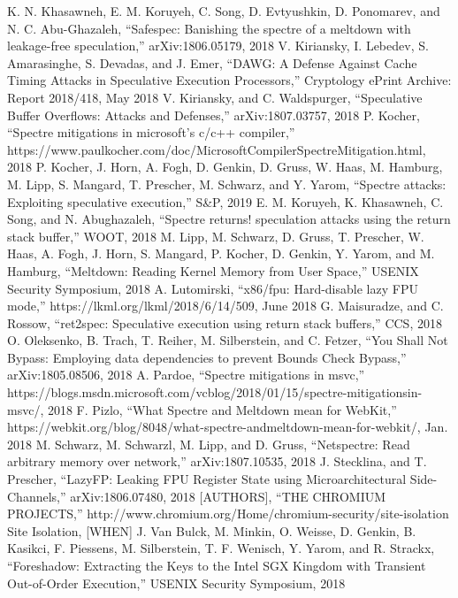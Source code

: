 \begin{thebibliography}{00}
     K. N. Khasawneh, E. M. Koruyeh, C. Song, D. Evtyushkin, D. Ponomarev, and N. C. Abu-Ghazaleh, ``Safespec: Banishing the spectre of a meltdown with leakage-free speculation,'' arXiv:1806.05179, 2018
     V. Kiriansky, I. Lebedev, S. Amarasinghe, S. Devadas, and J. Emer, ``DAWG: A Defense Against Cache Timing Attacks in Speculative Execution Processors,'' Cryptology ePrint Archive: Report 2018/418, May 2018
     V. Kiriansky, and C. Waldspurger, ``Speculative Buffer Overflows: Attacks and Defenses,'' arXiv:1807.03757, 2018
     P. Kocher, ``Spectre mitigations in microsoft’s c/c++ compiler,'' https://www.paulkocher.com/doc/MicrosoftCompilerSpectreMitigation.html, 2018
     P. Kocher, J. Horn, A. Fogh, D. Genkin, D. Gruss, W. Haas, M. Hamburg, M. Lipp, S. Mangard, T. Prescher, M. Schwarz, and Y. Yarom, ``Spectre attacks: Exploiting speculative execution,'' S\&P, 2019
     E. M. Koruyeh, K. Khasawneh, C. Song, and N. Abughazaleh, ``Spectre returns! speculation attacks using the return stack buffer,'' WOOT, 2018
     M. Lipp, M. Schwarz, D. Gruss, T. Prescher, W. Haas, A. Fogh, J. Horn, S. Mangard, P. Kocher, D. Genkin, Y. Yarom, and M. Hamburg, ``Meltdown: Reading Kernel Memory from User Space,'' USENIX Security Symposium, 2018
     A. Lutomirski, ``x86/fpu: Hard-disable lazy FPU mode,'' https://lkml.org/lkml/2018/6/14/509, June 2018
     G. Maisuradze, and C. Rossow, ``ret2spec: Speculative execution using return stack buffers,'' CCS, 2018
     O. Oleksenko, B. Trach, T. Reiher, M. Silberstein, and C. Fetzer, ``You Shall Not Bypass: Employing data dependencies to prevent Bounds Check Bypass,'' arXiv:1805.08506, 2018
     A. Pardoe, ``Spectre mitigations in msvc,'' https://blogs.msdn.microsoft.com/vcblog/2018/01/15/spectre-mitigationsin-msvc/, 2018
     F. Pizlo, ``What Spectre and Meltdown mean for WebKit,'' https://webkit.org/blog/8048/what-spectre-andmeltdown-mean-for-webkit/, Jan. 2018
     M. Schwarz, M. Schwarzl, M. Lipp, and D. Gruss, ``Netspectre: Read arbitrary memory over network,'' arXiv:1807.10535, 2018
     J. Stecklina, and T. Prescher, ``LazyFP: Leaking FPU Register State using Microarchitectural Side-Channels,'' arXiv:1806.07480, 2018
     [AUTHORS], ``THE CHROMIUM PROJECTS,'' http://www.chromium.org/Home/chromium-security/site-isolation Site Isolation, [WHEN]
     J. Van Bulck, M. Minkin, O. Weisse, D. Genkin, B. Kasikci, F. Piessens, M. Silberstein, T. F. Wenisch, Y. Yarom, and R. Strackx, ``Foreshadow: Extracting the Keys to the Intel SGX Kingdom with Transient Out-of-Order Execution,'' USENIX Security Symposium, 2018

\end{thebibliography}
